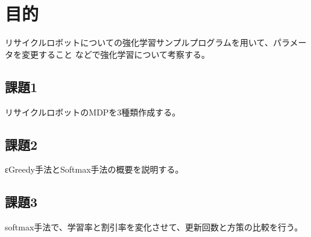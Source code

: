 \section{目的}
リサイクルロボットについての強化学習サンプルプログラムを用いて、パラメータを変更すること
などで強化学習について考察する。
\subsection{課題1}
リサイクルロボットのMDPを3種類作成する。

\subsection{課題2}
εGreedy手法とSoftmax手法の概要を説明する。

\subsection{課題3}
softmax手法で、学習率と割引率を変化させて、更新回数と方策の比較を行う。